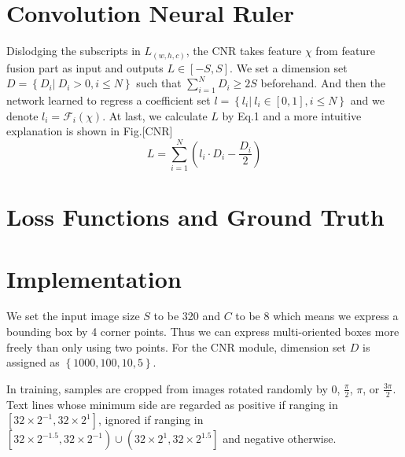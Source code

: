 \documentclass[10pt,twocolumn,letterpaper]{article}
\begin{document}
	
	
	\section{Convolution Neural Ruler}
	Dislodging the subscripts in $L_{\left(w, h, c\right)}$, the CNR takes feature $\chi$ from feature fusion part as input and outputs $L \in \left[-S, S\right]$.
	We set a dimension set $D = \left\{D_i \vert \ D_i > 0, i \leq N \right\}$ such that $\sum_{i = 1}^{N} D_i \geq 2S$ beforehand.
	And then the network learned to regress a coefficient set $l = \left\{ l_i \vert \ l_i \in \left[ 0, 1 \right], i \leq N \right\}$ and we denote $l_i = \mathcal{F}_i \left( \chi \right)$.
	At last, we calculate $L$ by Eq.1 and a more intuitive explanation is shown in Fig.[CNR]
	\begin{equation}
	L = \sum_{i = 1}^{N} \left( l_i \cdot D_i - \frac{D_i}{2} \right)
	\end{equation}
	
	\section{Loss Functions and Ground Truth}
	
	\section{Implementation}
	We set the input image size $S$ to be 320 and $C$ to be 8 which means we express a bounding box by 4 corner points. Thus we can express multi-oriented boxes more freely than only using two points. 
	For the CNR module, dimension set $D$ is assigned as $\left\{1000, 100, 10, 5\right\}$. 
	
	In training, samples are cropped from images rotated randomly by $0$, $\frac{\pi}{2}$, $\pi$, or $\frac{3\pi}{2}$. Text lines whose minimum side are regarded as positive if ranging in $\left[32 \times 2^{-1}, 32 \times 2^{1} \right]$, ignored if ranging in $\left[32 \times 2^{-1.5},  32 \times 2^{-1}\right) \cup \left(32 \times 2^{1},  32 \times 2^{1.5}\right]$ and negative otherwise.
	
	
	{\small
		
		
	}
	
\end{document}
